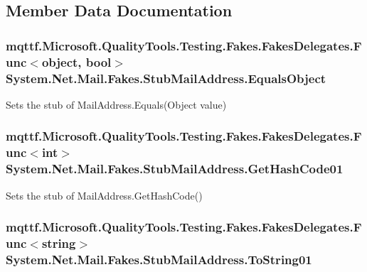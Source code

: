 \subsection{Member Data Documentation}
\hypertarget{class_system_1_1_net_1_1_mail_1_1_fakes_1_1_stub_mail_address_a5eace72fc49aaab242659c97c2b5ed33}{
\subsubsection[{Equals\-Object}]{\setlength{\rightskip}{0pt plus 5cm}mqttf.\-Microsoft.\-Quality\-Tools.\-Testing.\-Fakes.\-Fakes\-Delegates.\-Func$<$object, bool$>$ System.\-Net.\-Mail.\-Fakes.\-Stub\-Mail\-Address.\-Equals\-Object}}\label{class_system_1_1_net_1_1_mail_1_1_fakes_1_1_stub_mail_address_a5eace72fc49aaab242659c97c2b5ed33}


Sets the stub of Mail\-Address.\-Equals(\-Object value)

\hypertarget{class_system_1_1_net_1_1_mail_1_1_fakes_1_1_stub_mail_address_a0e030de91be2f79ddb49724753accada}{
\subsubsection[{Get\-Hash\-Code01}]{\setlength{\rightskip}{0pt plus 5cm}mqttf.\-Microsoft.\-Quality\-Tools.\-Testing.\-Fakes.\-Fakes\-Delegates.\-Func$<$int$>$ System.\-Net.\-Mail.\-Fakes.\-Stub\-Mail\-Address.\-Get\-Hash\-Code01}}\label{class_system_1_1_net_1_1_mail_1_1_fakes_1_1_stub_mail_address_a0e030de91be2f79ddb49724753accada}


Sets the stub of Mail\-Address.\-Get\-Hash\-Code()

\hypertarget{class_system_1_1_net_1_1_mail_1_1_fakes_1_1_stub_mail_address_a9eb454138ca8f4c4e61c442f0dc2bd05}{
\subsubsection[{To\-String01}]{\setlength{\rightskip}{0pt plus 5cm}mqttf.\-Microsoft.\-Quality\-Tools.\-Testing.\-Fakes.\-Fakes\-Delegates.\-Func$<$string$>$ System.\-Net.\-Mail.\-Fakes.\-Stub\-Mail\-Address.\-To\-String01}}\label{class_system_1_1_net_1_1_mail_1_1_fakes_1_1_stub_mail_address_a9eb454138ca8f4c4e61c442f0dc2bd05}


